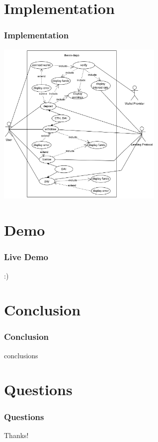 \documentclass{beamer}
\begin{document}
\section{Implementation}

\begin{frame}
\frametitle{Implementation}
\includegraphics[width=0.6\textwidth, center]{../images/USECASE-full_nofl1}
\end{frame}

\section{Demo}

\begin{frame}
\frametitle{Live Demo}
	:)
\end{frame}


\section{Conclusion}

\begin{frame}
\frametitle{Conclusion}
conclusions
\end{frame}


\section{Questions}

\begin{frame}
\frametitle{Questions}

\Huge{\centerline{Thanks!}}
\end{frame}

\end{document}
